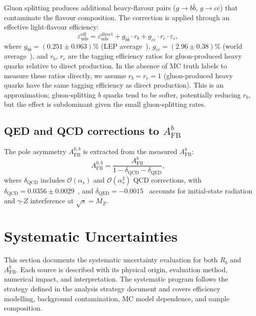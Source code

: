 \documentclass[11pt,a4paper]{article}
\begin{document}
Gluon splitting produces additional heavy-flavour pairs ($g \to b\bar{b}$,
$g \to c\bar{c}$) that contaminate the flavour composition. The correction is
applied through an effective light-flavour efficiency:
\begin{equation}
\varepsilon_\mathrm{uds}^\mathrm{eff} = \varepsilon_\mathrm{uds}^\mathrm{direct}
+ g_{b\bar{b}} \cdot r_b + g_{c\bar{c}} \cdot r_c \cdot \varepsilon_c,
\label{eq:gluon_correction}
\end{equation}
where $g_{b\bar{b}} = (0.251 \pm 0.063)\%$ (LEP average~\cite{LEP:HF:2001}),
$g_{c\bar{c}} = (2.96 \pm 0.38)\%$ (world average~\cite{LEP:gcc}), and $r_b$, $r_c$
are the tagging efficiency ratios for gluon-produced heavy quarks relative to direct
production. In the absence of MC truth labels to measure these ratios directly,
we assume $r_b = r_c = 1$ (gluon-produced heavy quarks have the same tagging
efficiency as direct production). This is an approximation; gluon-splitting
$b$ quarks tend to be softer, potentially reducing $r_b$, but the effect
is subdominant given the small gluon-splitting rates.

\subsection{QED and QCD corrections to $A_\mathrm{FB}^b$}
\label{sec:qcd_corrections}

The pole asymmetry $A_\mathrm{FB}^{0,b}$ is extracted from the measured $A_\mathrm{FB}^b$:
\begin{equation}
A_\mathrm{FB}^{0,b} = \frac{A_\mathrm{FB}^b}{1 - \delta_\mathrm{QCD} - \delta_\mathrm{QED}},
\label{eq:pole_correction}
\end{equation}
where $\delta_\mathrm{QCD}$ includes $\mathcal{O}(\alpha_s)$ and $\mathcal{O}(\alpha_s^2)$
QCD corrections, with $\delta_\mathrm{QCD} = 0.0356 \pm 0.0029$~\cite{LEP:EWWG:2005},
and $\delta_\mathrm{QED} = -0.0015$~\cite{LEP:EWWG:2005} accounts for initial-state
radiation and $\gamma$-$Z$ interference at $\sqrt{s} = M_Z$.

\FloatBarrier
{}
\section{Systematic Uncertainties}
\label{sec:systematics}

This section documents the systematic uncertainty evaluation for both $R_b$ and
$A_\mathrm{FB}^b$. Each source is described with its physical origin, evaluation
method, numerical impact, and interpretation. The systematic program follows the
strategy defined in the analysis strategy document and covers efficiency modelling, background
contamination, MC model dependence, and sample composition.
\end{document}
